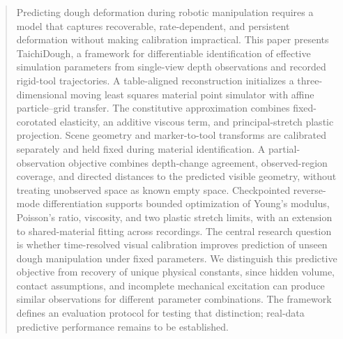 \begin{abstract}
Predicting dough deformation during robotic manipulation requires a model that captures recoverable, rate-dependent, and persistent deformation without making calibration impractical. This paper presents TaichiDough, a framework for differentiable identification of effective simulation parameters from single-view depth observations and recorded rigid-tool trajectories. A table-aligned reconstruction initializes a three-dimensional moving least squares material point simulator with affine particle--grid transfer. The constitutive approximation combines fixed-corotated elasticity, an additive viscous term, and principal-stretch plastic projection. Scene geometry and marker-to-tool transforms are calibrated separately and held fixed during material identification. A partial-observation objective combines depth-change agreement, observed-region coverage, and directed distances to the predicted visible geometry, without treating unobserved space as known empty space. Checkpointed reverse-mode differentiation supports bounded optimization of Young's modulus, Poisson's ratio, viscosity, and two plastic stretch limits, with an extension to shared-material fitting across recordings. The central research question is whether time-resolved visual calibration improves prediction of unseen dough manipulation under fixed parameters. We distinguish this predictive objective from recovery of unique physical constants, since hidden volume, contact assumptions, and incomplete mechanical excitation can produce similar observations for different parameter combinations. The framework defines an evaluation protocol for testing that distinction; real-data predictive performance remains to be established.
\end{abstract}
